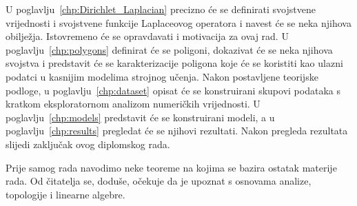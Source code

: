 \begin{intro}
    \par

    U poglavlju~\ref{chp:Dirichlet_Laplacian} precizno će se definirati svojstvene vrijednosti i svojstvene funkcije Laplaceovog operatora i navest će se neka njihova obilježja. Istovremeno će se opravdavati i motivacija za ovaj rad. U poglavlju~\ref{chp:polygons} definirat će se poligoni, dokazivat će se neka njihova svojstva i predstavit će se karakterizacije poligona koje će se koristiti kao ulazni podatci u kasnijim modelima strojnog učenja. Nakon postavljene teorijske podloge, u poglavlju~\ref{chp:dataset} opisat će se konstruirani skupovi podataka s kratkom eksploratornom analizom numeričkih vrijednosti. U poglavlju~\ref{chp:models} predstavit će se konstruirani modeli, a u poglavlju~\ref{chp:results} pregledat će se njihovi rezultati. Nakon pregleda rezultata slijedi zaključak ovog diplomskog rada.

    \par

    \thispagestyle{empty}%
    \makeatletter%
    \@mkboth{}{}%
    \makeatother

    Prije samog rada navodimo neke teoreme na kojima se bazira ostatak materije rada. Od čitatelja se, doduše, očekuje da je upoznat s osnovama analize, topologije i linearne algebre.

    \par


\end{intro}
